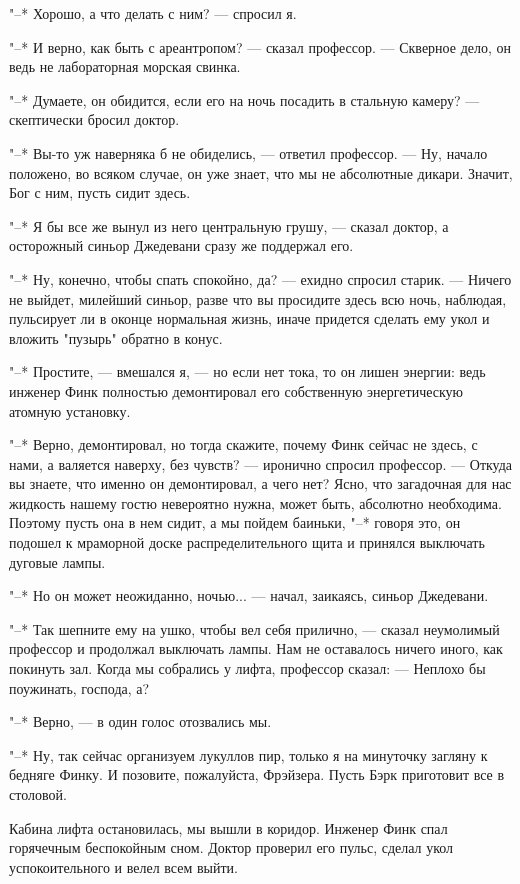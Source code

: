 "--* Хорошо, а что делать с ним? --- спросил я.

"--* И верно, как быть с ареантропом? --- сказал профессор. --- Скверное дело,
он ведь не лабораторная морская свинка.

"--* Думаете, он обидится, если его на ночь посадить в стальную камеру?  ---
скептически бросил доктор.

"--* Вы-то уж наверняка б не обиделись, --- ответил профессор. --- Ну,  начало
положено, во всяком случае, он уже знает, что  мы  не  абсолютные  дикари.
Значит, Бог с ним, пусть сидит здесь.

"--* Я бы все же вынул из него  центральную  грушу,  ---  сказал  доктор,  а
осторожный синьор Джедевани сразу же поддержал его.

"--* Ну, конечно, чтобы спать спокойно, да? ---  ехидно  спросил  старик.  ---
Ничего не выйдет, милейший синьор, разве что вы просидите здесь всю  ночь,
наблюдая, пульсирует ли в оконце нормальная жизнь, иначе придется  сделать
ему укол и вложить "пузырь" обратно в конус.

"--* Простите, --- вмешался я, --- но если нет тока, то он лишен энергии: ведь
инженер Финк полностью демонтировал его собственную энергетическую атомную
установку.

"--* Верно, демонтировал, но тогда скажите, почему Финк сейчас не здесь, с
нами, а валяется наверху, без чувств?  ---  иронично  спросил  профессор.  ---
Откуда вы знаете, что именно  он  демонтировал,  а  чего  нет?  Ясно,  что
загадочная для нас жидкость нашему гостю  невероятно  нужна,  может  быть,
абсолютно необходима. Поэтому пусть она в нем сидит, а мы пойдем  баиньки,
"--* говоря это, он подошел  к  мраморной  доске  распределительного  щита  и
принялся выключать дуговые лампы.

"--* Но он может неожиданно, ночью... --- начал, заикаясь, синьор Джедевани.

"--* Так шепните ему на ушко, чтобы вел себя прилично, --- сказал неумолимый
профессор и продолжал выключать лампы. Нам не оставалось ничего иного, как
покинуть зал. Когда мы собрались у лифта, профессор сказал: ---  Неплохо  бы
поужинать, господа, а?

"--* Верно, --- в один голос отозвались мы.

"--* Ну, так сейчас организуем лукуллов пир, только я на минуточку загляну
к бедняге Финку. И позовите, пожалуйста, Фрэйзера. Пусть  Бэрк  приготовит
все в столовой.

Кабина лифта остановилась,  мы  вышли  в  коридор.  Инженер  Финк  спал
горячечным беспокойным  сном.  Доктор  проверил  его  пульс,  сделал  укол
успокоительного и велел всем выйти.


